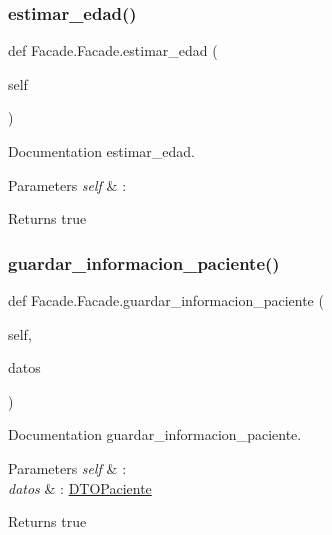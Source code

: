 \subsubsection{\texorpdfstring{estimar\+\_\+edad()}{estimar\_edad()}}
{\footnotesize\ttfamily def Facade.\+Facade.\+estimar\+\_\+edad (\begin{DoxyParamCaption}\item[{}]{self }\end{DoxyParamCaption})}



Documentation estimar\+\_\+edad. 


\begin{DoxyParams}{Parameters}
{\em self} & \+: \\
\hline
\end{DoxyParams}
\begin{DoxyReturn}{Returns}
true 
\end{DoxyReturn}
\mbox{\label{class_facade_1_1_facade_a1bf0fe7872a81826af422d1efeccef92}} 
\subsubsection{\texorpdfstring{guardar\+\_\+informacion\+\_\+paciente()}{guardar\_informacion\_paciente()}}
{\footnotesize\ttfamily def Facade.\+Facade.\+guardar\+\_\+informacion\+\_\+paciente (\begin{DoxyParamCaption}\item[{}]{self,  }\item[{}]{datos }\end{DoxyParamCaption})}



Documentation guardar\+\_\+informacion\+\_\+paciente. 


\begin{DoxyParams}{Parameters}
{\em self} & \+: \\
\hline
{\em datos} & \+: \mbox{\hyperlink{namespace_d_t_o_paciente}{D\+T\+O\+Paciente}} \\
\hline
\end{DoxyParams}
\begin{DoxyReturn}{Returns}
true 
\end{DoxyReturn}


